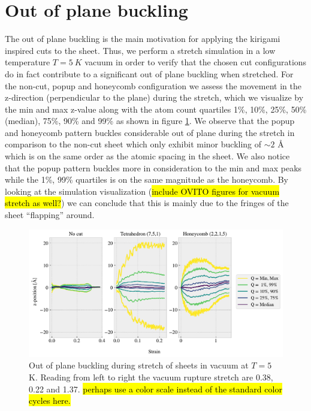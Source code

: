 \section{Out of plane buckling}

The out of plane buckling is the main motivation for applying the kirigami
inspired cuts to the sheet. Thus, we perform a stretch simulation in a low
temperature $T = \SI{5}{K}$ vacuum in order to verify that the chosen cut
configurations do in fact contribute to a significant out of plane buckling when
stretched. For the non-cut, popup and honeycomb configuration we assess the
movement in the z-direction (perpendicular to the plane) during the stretch,
which we visualize by the min and max z-value along with the atom count
quartiles 1\%, 10\%, 25\%, 50\% (median), 75\%, 90\% and 99\% as shown in figure
\ref{fig:buckling_quartiles}. We observe that the popup and honeycomb pattern
buckles considerable out of plane during the stretch in comparison to the non-cut sheet which only exhibit minor buckling of $\sim 2$ Å which is on the same order as the
atomic spacing in the sheet. We also notice that the popup pattern
buckles more in consideration to the min and max peaks while the 1\%, 99\%
quartiles is on the same magnitude as the honeycomb. By looking at the simulation visualization
(\hl{include OVITO figures for vacuum stretch as well?}) we can conclude that this is mainly due to the fringes
of the sheet ``flapping'' around. 


\begin{figure}[H]
  \centering
  \includegraphics[width=\linewidth]{figures/baseline/vacuum_normal_buckling}
  \caption{Out of plane buckling during stretch of sheets in vacuum at $T = 5$ K. Reading from left to right the vacuum rupture stretch are 0.38, 0.22 and 1.37. \hl{perhaps use a color scale instead of the standard color cycles here.}}
  \label{fig:buckling_quartiles}
\end{figure}


